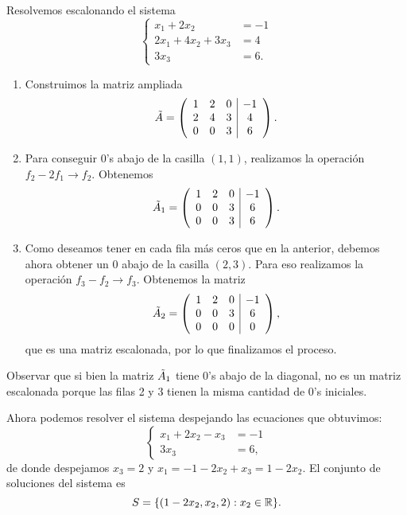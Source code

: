 \begin{ejemplo}
Resolvemos escalonando el sistema
$$
\left\{
\begin{aligned}
x_1 + 2x_2 &= -1 \\
2x_1 + 4x_2 + 3 x_3 &= 4 \\
3 x_3 &= 6.
\end{aligned}
\right.
$$

\begin{enumerate}
\item Construimos la matriz ampliada
$$\tilde \Ab = \left( \begin{array}{ccc|c}
1 & 2 & 0 & -1 \\ 2 & 4 & 3 & 4 \\ 0 & 0 & 3 & 6 \end{array} \right).$$
\item Para conseguir 0's abajo de la casilla $(1,1)$, realizamos la operación $f_2 - 2f_1 \rightarrow f_2$.  Obtenemos
$$\tilde \Ab_1 = \left( \begin{array}{ccc|c}
1 & 2 & 0 & -1 \\ 0 & 0 & 3 & 6 \\ 0 & 0 & 3 & 6 \end{array} \right).$$

\item Como deseamos tener en cada fila m\'as ceros que en la anterior, debemos ahora obtener un 0 abajo de la casilla $(2, 3)$. Para eso realizamos la operaci\'on $f_3 - f_2 \rightarrow f_3$.  Obtenemos la matriz
$$
\tilde \Ab_2 = \left( \begin{array}{ccc|c} 1 & 2 & 0 & -1 \\ 0 & 0 & 3 & 6 \\ 0 & 0 & 0 & 0 \end{array}\right),
$$
que es una matriz escalonada, por lo que finalizamos el proceso.
\end{enumerate}

Observar que si bien la matriz $\tilde \Ab_1$ tiene 0's abajo de la diagonal, no es un matriz escalonada porque las filas 2 y 3 tienen la misma cantidad de 0's iniciales.

Ahora podemos resolver el sistema despejando las ecuaciones que obtuvimos:
$$ \left\{
\begin{aligned}
x_1 + 2 x_2 - x_3 &= -1 \\
3 x_3 &= 6,
\end{aligned}
\right.
$$
de donde despejamos $x_3 = 2$ y $x_1 = -1 - 2 x_2 + x_3 = 1-2x_2$. El conjunto de soluciones del sistema es
$$
S = \{(1-2x_2, x_2, 2): x_2 \in \mathbb R\}.
$$
\end{ejemplo}


